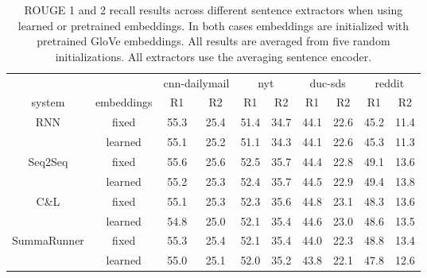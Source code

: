 \begin{table*}
\center
\begin{tabular}{| c | c || c | c | c | c | c | c | c | c |}
\hline
  &   & \multicolumn{2}{|c|}{cnn-dailymail} & \multicolumn{2}{|c|}{nyt} & \multicolumn{2}{|c|}{duc-sds} & \multicolumn{2}{|c|}{reddit} \\
system & embeddings & R1 & R2  & R1 & R2  & R1 & R2  & R1 & R2  \\
\hline
\multirow{2}{*}{RNN} & fixed & 55.3 & 25.4 & 51.4 & 34.7 & 44.1 & 22.6 & 45.2 & 11.4\\ \cline{2-10}
 & learned & 55.1 & 25.2 & 51.1 & 34.3 & 44.1 & 22.6 & 45.3 & 11.3\\
\hline
\multirow{2}{*}{Seq2Seq} & fixed & 55.6 & 25.6 & 52.5 & 35.7 & 44.4 & 22.8 & 49.1 & 13.6\\ \cline{2-10}
 & learned & 55.2 & 25.3 & 52.4 & 35.7 & 44.5 & 22.9 & 49.4 & 13.8\\
\hline
\multirow{2}{*}{C\&L} & fixed & 55.1 & 25.3 & 52.3 & 35.6 & 44.8 & 23.1 & 48.3 & 13.6\\ \cline{2-10}
 & learned & 54.8 & 25.0 & 52.1 & 35.4 & 44.6 & 23.0 & 48.6 & 13.5\\
\hline
\multirow{2}{*}{SummaRunner} & fixed & 55.3 & 25.4 & 52.1 & 35.4 & 44.0 & 22.3 & 48.8 & 13.4\\ \cline{2-10}
 & learned & 55.0 & 25.1 & 52.0 & 35.2 & 43.8 & 22.1 & 47.8 & 12.6\\
\hline
\end{tabular}
\caption{ROUGE 1 and 2 recall results across different sentence extractors
    when using learned or pretrained embeddings. In both cases embeddings
    are initialized with pretrained GloVe embeddings. All results are 
averaged from five random initializations. All extractors use the averaging 
sentence encoder.}
\label{tab:embeddings}
\end{table*}
